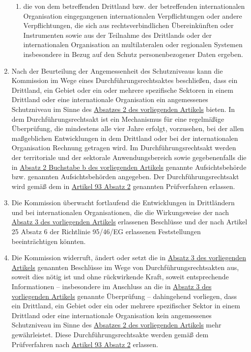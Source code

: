 \begin{enumerate}
\begin{enumerate}
    \item die von dem betreffenden Drittland bzw. der betreffenden internationalen Organisation eingegangenen
     internationalen Verpflichtungen oder andere Verpflichtungen, die sich aus rechtsverbindlichen Übereinkünften oder
     Instrumenten sowie aus der Teilnahme des Drittlands oder der internationalen Organisation an multilateralen oder
     regionalen Systemen insbesondere in Bezug auf den Schutz personenbezogener Daten ergeben.
    \label{itm:45-2c}

  \end{enumerate}

  \item Nach der Beurteilung der Angemessenheit des Schutzniveaus kann die Kommission im Wege eines
   Durchführungsrechtsaktes beschließen, dass ein Drittland, ein Gebiet oder ein oder mehrere spezifische Sektoren in
   einem Drittland oder eine internationale Organisation ein angemessenes Schutzniveau im Sinne des \hyperref[itm:45-2]
   {Absatzes 2 des vorliegenden Artikels} bieten. In dem Durchführungsrechtsakt ist ein Mechanismus für eine
   regelmäßige Überprüfung, die mindestens alle vier Jahre erfolgt, vorzusehen, bei der allen maßgeblichen
   Entwicklungen in dem Drittland oder bei der internationalen Organisation Rechnung getragen wird. Im
   Durchführungsrechtsakt werden der territoriale und der sektorale Anwendungsbereich sowie gegebenenfalls die in
   \hyperref[itm:45-2b]{Absatz 2 Buchstabe b des vorliegenden Artikels} genannte Aufsichtsbehörde bzw. genannten
   Aufsichtsbehörden angegeben. Der Durchführungsrechtsakt wird gemäß dem in \hyperref[itm:93-2]{Artikel 93 Absatz 2}
   genannten Prüfverfahren erlassen.
  \label{itm:45-3}

  \item Die Kommission überwacht fortlaufend die Entwicklungen in Drittländern und bei internationalen Organisationen,
   die die Wirkungsweise der nach \hyperref[itm:45-3]{Absatz 3 des vorliegenden Artikels} erlassenen Beschlüsse und der
   nach Artikel 25 Absatz 6 der Richtlinie 95/46/EG erlassenen Feststellungen beeinträchtigen
   könnten.
  \label{itm:45-4}

  \item Die Kommission widerruft, ändert oder setzt die in \hyperref[itm:45-3]{Absatz 3 des vorliegenden Artikels}
   genannten Beschlüsse im Wege von Durchführungsrechtsakten aus, soweit dies nötig ist und ohne rückwirkende Kraft,
   soweit entsprechende Informationen -- insbesondere im Anschluss an die in \hyperref[itm:45-3]{Absatz 3 des
   vorliegenden Artikels} genannte Überprüfung -- dahingehend vorliegen, dass ein Drittland, ein Gebiet oder ein oder
   mehrere spezifischer Sektor in einem Drittland oder eine internationale Organisation kein angemessenes Schutzniveau
   im Sinne des \hyperref[itm:45-2]{Absatzes 2 des vorliegenden Artikels} mehr gewährleistet. Diese
   Durchführungsrechtsakte werden gemäß dem Prüfverfahren nach \hyperref[itm:93-2]{Artikel 93 Absatz 2} erlassen. 
  \label{itm:45-5}


\end{enumerate}
